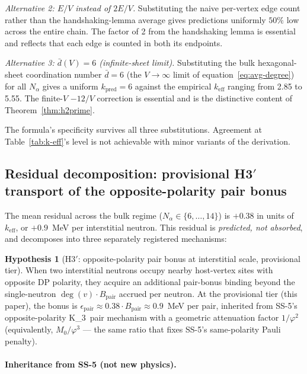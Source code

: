 \documentclass[11pt,letterpaper]{article}
\theoremstyle{definition}
\newtheorem{hypothesis}[theorem]{Hypothesis}
\newcommand{\Mzero}{M_0}
\newcommand{\phig}{\varphi}
\newcommand{\Bpair}{B_{\text{pair}}}
\newcommand{\Nalpha}{N_\alpha}
\newcommand{\Kthree}{K_3}
\newcommand{\degv}{\deg(v)}
\begin{document}
\emph{Alternative 2: $E/V$ instead of $2E/V$.} Substituting the naive per-vertex edge count rather than the handshaking-lemma average gives predictions uniformly $50\%$ low across the entire chain. The factor of 2 from the handshaking lemma is essential and reflects that each edge is counted in both its endpoints.

\emph{Alternative 3: $\bar{d}(V) = 6$ (infinite-sheet limit).} Substituting the bulk hexagonal-sheet coordination number $\bar{d} = 6$ (the $V \to \infty$ limit of equation~\eqref{eq:avg-degree}) for all $\Nalpha$ gives a uniform $k_{\text{pred}} = 6$ against the empirical $k_{\text{eff}}$ ranging from 2.85 to 5.55. The finite-$V$ $-12/V$ correction is essential and is the distinctive content of Theorem~\ref{thm:h2prime}.

The formula's specificity survives all three substitutions. Agreement at Table~\ref{tab:k-eff}'s level is not achievable with minor variants of the derivation.

\subsection{Residual decomposition: provisional H3$'$ transport of the opposite-polarity pair bonus}
\label{sec:residual-decomposition}

The mean residual across the bulk regime ($\Nalpha \in \{6, \ldots, 14\}$) is $+0.38$ in units of $k_{\text{eff}}$, or $+0.9$~MeV per interstitial neutron. This residual is \emph{predicted, not absorbed}, and decomposes into three separately registered mechanisms:

\begin{hypothesis}[H3$'$: opposite-polarity pair bonus at interstitial scale, provisional tier]
\label{hyp:h3prime}
When two interstitial neutrons occupy nearby host-vertex sites with opposite DP polarity, they acquire an additional pair-bonus binding beyond the single-neutron $\degv \cdot \Bpair$ accrued per neutron. At the provisional tier (this paper), the bonus is $\epsilon_{\text{pair}} \approx 0.38 \cdot \Bpair \approx 0.9$~MeV per pair, inherited from SS-5's opposite-polarity \Kthree\ pair mechanism with a geometric attenuation factor $1/\phig^2$ (equivalently, $\Mzero/\phig^3$ --- the same ratio that fixes SS-5's same-polarity Pauli penalty).
\end{hypothesis}

\paragraph{Inheritance from SS-5 (not new physics).}
\end{document}
